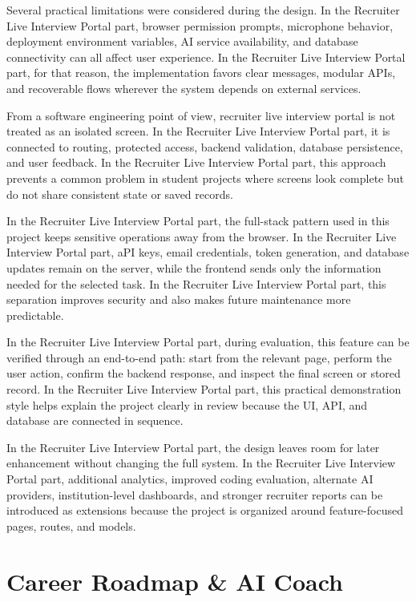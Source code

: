 \documentclass[12pt,a4paper]{report}
\begin{document}
Several practical limitations were considered during the design. In the Recruiter Live Interview Portal part, browser permission prompts, microphone behavior, deployment environment variables, AI service availability, and database connectivity can all affect user experience. In the Recruiter Live Interview Portal part, for that reason, the implementation favors clear messages, modular APIs, and recoverable flows wherever the system depends on external services.


From a software engineering point of view, recruiter live interview portal is not treated as an isolated screen. In the Recruiter Live Interview Portal part, it is connected to routing, protected access, backend validation, database persistence, and user feedback. In the Recruiter Live Interview Portal part, this approach prevents a common problem in student projects where screens look complete but do not share consistent state or saved records.


In the Recruiter Live Interview Portal part, the full-stack pattern used in this project keeps sensitive operations away from the browser. In the Recruiter Live Interview Portal part, aPI keys, email credentials, token generation, and database updates remain on the server, while the frontend sends only the information needed for the selected task. In the Recruiter Live Interview Portal part, this separation improves security and also makes future maintenance more predictable.


In the Recruiter Live Interview Portal part, during evaluation, this feature can be verified through an end-to-end path: start from the relevant page, perform the user action, confirm the backend response, and inspect the final screen or stored record. In the Recruiter Live Interview Portal part, this practical demonstration style helps explain the project clearly in review because the UI, API, and database are connected in sequence.


In the Recruiter Live Interview Portal part, the design leaves room for later enhancement without changing the full system. In the Recruiter Live Interview Portal part, additional analytics, improved coding evaluation, alternate AI providers, institution-level dashboards, and stronger recruiter reports can be introduced as extensions because the project is organized around feature-focused pages, routes, and models.


\section{Career Roadmap \& AI Coach}
\end{document}
